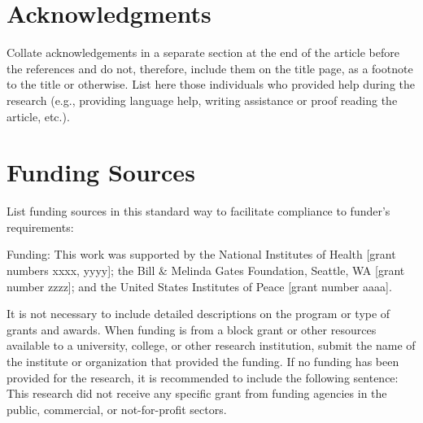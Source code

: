 \documentclass[preprint,review,12pt]{dependencies/elsarticle}
\begin{document}
\section{Acknowledgments}
\label{sec:acknowledgments}
%
Collate acknowledgements in a separate section at the end of the article before the references and do not, therefore, include them on the title page, as a footnote to the title or otherwise.
List here those individuals who provided help during the research (e.g., providing language help, writing assistance or proof reading the article, etc.).
%
\section{Funding Sources}
\label{sec:funding_sources}
%
List funding sources in this standard way to facilitate compliance to funder's requirements:

Funding: This work was supported by the National Institutes of Health [grant numbers xxxx, yyyy]; the Bill \& Melinda Gates Foundation, Seattle, WA [grant number zzzz]; and the United States Institutes of Peace [grant number aaaa].

It is not necessary to include detailed descriptions on the program or type of grants and awards.
When funding is from a block grant or other resources available to a university, college, or other research institution, submit the name of the institute or organization that provided the funding.
If no funding has been provided for the research, it is recommended to include the following sentence:
This research did not receive any specific grant from funding agencies in the public, commercial, or not-for-profit sectors.
%
%
\appendix


%
\end{document}
